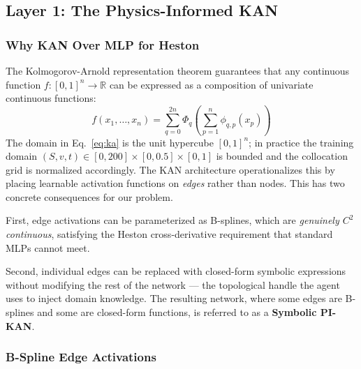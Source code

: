 \documentclass[11pt,a4paper]{article}
\begin{document}
\subsection{Layer 1: The Physics-Informed KAN}
\label{sec:arch:pikan}

\subsubsection{Why KAN Over MLP for Heston}

The Kolmogorov-Arnold representation theorem \citep{kolmogorov1957representation}
guarantees that any continuous function $f:[0,1]^n\to\mathbb{R}$ can be expressed as a
composition of univariate continuous functions:
\begin{equation}
f(x_1, \ldots, x_n) = \sum_{q=0}^{2n} \Phi_q\!\left(\sum_{p=1}^{n} \phi_{q,p}(x_p)\right)
\label{eq:ka}
\end{equation}
The domain in Eq.~\eqref{eq:ka} is the unit hypercube $[0,1]^n$; in practice the
training domain $(S,v,t)\in[0,200]\times[0,0.5]\times[0,1]$ is bounded and the
collocation grid is normalized accordingly. The KAN architecture \citep{liu_etal_2024_kan}
operationalizes this by placing learnable activation functions on \emph{edges} rather
than nodes. This has two concrete consequences for our problem.

First, edge activations can be parameterized as B-splines, which are \emph{genuinely
$C^2$ continuous}, satisfying the Heston cross-derivative requirement that standard MLPs
cannot meet.

Second, individual edges can be replaced with closed-form symbolic expressions without
modifying the rest of the network --- the topological handle the agent uses to inject
domain knowledge. The resulting network, where some edges are B-splines and some are
closed-form functions, is referred to as a \textbf{Symbolic PI-KAN}.

\subsubsection{B-Spline Edge Activations}
\end{document}
